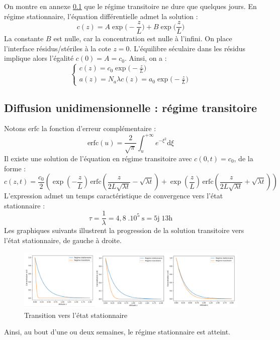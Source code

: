 \documentclass{article}
\begin{document}
On montre en annexe \ref{annexe:reg_trans} que le régime transitoire ne dure que quelques jours. En régime stationnaire, l’équation différentielle admet la solution :
$$
c(z)=A \exp \Big(-\frac{z}{L} \Big)+B \exp \Big( \frac{z}{L} \Big)
$$
La constante $B$ est nulle, car la concentration est nulle à l’infini. On place l’interface résidus/stériles à la cote $z=0$. L’équilibre séculaire dans les résidus implique alors l’égalité $c(0)=A=c_0$. Ainsi, on a :
$$
\left\{ \begin{array}{cl}
c(z)=c_0 \exp\Big(-\frac{z}{L}\Big) \\
a(z)=N_a \lambda c(z) =a_0 \exp\Big(-\frac{z}{L}\Big)
\end{array} \right.
$$

\subsection{Diffusion unidimensionnelle : régime transitoire}
\label{annexe:reg_trans}

Notons $\text{erfc}$ la fonction d’erreur complémentaire :
$$
\text{erfc}(u)=\frac{2}{\sqrt{\pi}} \int_{u}^{+\infty } e^{-\xi^2} \text{d}\xi
$$
Il existe une solution de l’équation en régime transitoire avec $c(0,t)=c_0$, de la forme :
$$
c(z,t)=\frac{c_0}{2} \left( \exp\!\left(-\frac{z}{L}\right) \, \text{erfc}\!\left(\frac{z}{2L\sqrt{ \lambda t}} - \sqrt{\lambda t}\right) + \exp\!\left(\frac{z}{L}\right) \, \text{erfc}\!\left(\frac{z}{2L\sqrt{\lambda t}} + \sqrt{\lambda t} \right) \right)
$$
L’expression admet un temps caractéristique de convergence vers l’état stationnaire :
$$
\tau=\frac{1}{\lambda}=4,8 \; .10^5 \; \text{s}=5\text{j} \; 13\text{h}
$$
Les graphiques suivants illustrent la progression de la solution transitoire vers l'état stationnaire, de gauche à droite.
\begin{figure}[H]
    \centering
    \includegraphics[width = \linewidth]{III_C_3.png}
    \caption{Transition vers l'état stationnaire}
    \label{fig:diffusion_transitoire}
\end{figure}

Ainsi, au bout d'une ou deux semaines, le régime stationnaire est atteint.
\end{document}
